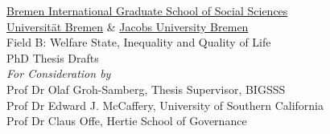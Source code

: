 \begin{titlepage}

\centering

\thispagestyle{empty}

\vspace*{\fill}

			{\Large \href{http://www.bigsss-bremen.de}{Bremen International Graduate School of Social Sciences}}\\
			{\Large \href{http://www.uni-bremen.de}{Universit\"at Bremen} \& \href{http://www.jacobs-university.de}{Jacobs University Bremen}}\\ \vspace{15pt}
			{\Large Field B: Welfare State, Inequality and Quality of Life}\\
			 \vspace{50pt} 
			{\Large PhD Thesis Drafts}\\ 	\vspace{30pt}
			{\Large \emph{For Consideration by}} \\ \vspace{30pt}
			{\large Prof Dr Olaf Groh-Samberg, Thesis Supervisor, BIGSSS}\\ 
	\vspace{10pt}
			{\large Prof Dr Edward J. McCaffery, University of Southern California}\\
			{\large Prof Dr Claus Offe, Hertie School of Governance}\\
			\vspace{30pt} 

\vspace*{\fill}
	
\end{titlepage}
